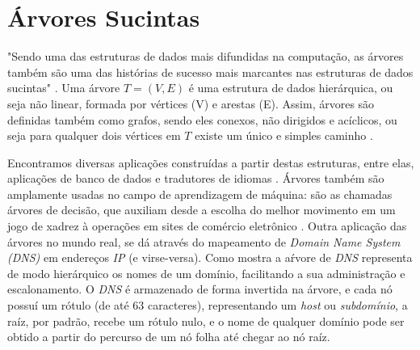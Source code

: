 \section{Árvores Sucintas}
"Sendo uma das estruturas de dados mais difundidas na computação, as árvores também são uma das histórias de sucesso mais marcantes nas estruturas de dados sucintas" \cite[tradução nossa]{book-compact-data-structures}. Uma árvore $T=(V,E)$ é uma estrutura de dados hierárquica, ou seja não linear, formada por vértices (V) e arestas (E). Assim, árvores são definidas também como grafos, sendo eles conexos, não dirigidos e acíclicos, ou seja para qualquer dois vértices em $T$ existe um único e simples caminho \citep{book-algoritmos-teoria-pratica}.



Encontramos diversas aplicações construídas a partir destas estruturas, entre elas, aplicações de banco de dados e tradutores de idiomas \citep{book-algoritmos-teoria-pratica}. Árvores também são amplamente usadas no campo de aprendizagem de máquina: são as chamadas árvores de decisão, que auxiliam desde a escolha do melhor movimento em um jogo de xadrez  à operações em sites de comércio eletrônico \citep{book-inteligencia-artificial}. 
Outra aplicação das árvores no mundo real, se dá através do mapeamento de \textit{Domain Name System (DNS)} em endereços \textit{IP} (e virse-versa). Como mostra  \citep{arvore-dns}  a aŕvore de \textit{DNS} representa de modo hierárquico os nomes de um domínio, facilitando a sua administração e escalonamento. O \textit{DNS} é armazenado de forma invertida na árvore, e cada nó possuí um rótulo (de até $63$ caracteres), representando um \textit{host} ou \textit{subdomínio}, a raíz, por padrão, recebe um rótulo nulo, e o nome de qualquer domínio pode ser obtido a partir do percurso de um nó folha até chegar ao nó raíz.
